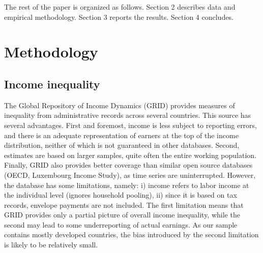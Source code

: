 \documentclass[12pt, a4paper]{article}
\begin{document}

The rest of the paper is organized as follows. Section 2 describes data and empirical methodology. Section 3 reports the results. Section 4 concludes.


\section{Methodology}

\subsection{Income inequality} 
The Global Repository of Income Dynamics (GRID) provides measures of inequality from administrative records across several countries. This source has several advantages. First and foremost, income is less subject to reporting errors, and there is an adequate representation of earners at the top of the income distribution, neither of which is not guaranteed in other databases. Second, estimates are based on larger samples, quite often the entire working population. Finally, GRID also provides better coverage than similar open source databases (OECD, Luxembourg Income Study), as time series are uninterrupted. However, the database has some limitations, namely: i) income refers to labor income at the individual level (ignores household pooling), ii) since it is based on tax records, envelope payments are not included. The first limitation means that GRID provides only a partial picture of overall income inequality, while the second may lead to some underreporting of actual earnings. As our sample contains mostly developed countries, the bias introduced by the second limitation is likely to be relatively small.
\end{document}
